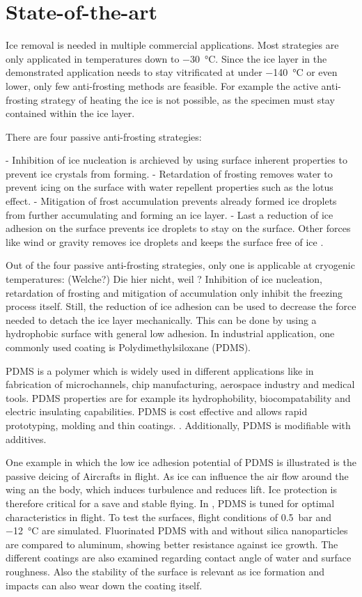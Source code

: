 \section{State-of-the-art}

Ice removal is needed in multiple commercial applications. Most strategies are only applicated in temperatures down to \SI{-30}{\degreeCelsius}. Since the ice layer in the demonstrated application needs to stay vitrificated at under \SI{-140}{\degreeCelsius} or even lower, only few anti-frosting methods are feasible. For example the active anti-frosting strategy of heating the ice is not possible, as the specimen must stay contained within the ice layer.

There are four passive anti-frosting strategies: 

- Inhibition of ice nucleation is archieved by using surface inherent properties to prevent ice crystals from forming. 
- Retardation of frosting removes water to prevent icing on the surface with water repellent properties such as the lotus effect.
- Mitigation of frost accumulation prevents already formed ice droplets from further accumulating and forming an ice layer. 
- Last a reduction of ice adhesion on the surface prevents ice droplets to stay on the surface. Other forces like wind or gravity removes ice droplets and keeps the surface free of ice \cite{Yang.2021}. 

Out of the four passive anti-frosting strategies, only one is applicable at cryogenic temperatures: (Welche?) Die hier nicht, weil ? Inhibition of ice nucleation, retardation of frosting and mitigation of accumulation only inhibit the freezing process itself. Still, the reduction of ice adhesion can be used to decrease the force needed to detach the ice layer mechanically. This can be done by using a hydrophobic surface with general low adhesion. In industrial application, one commonly used coating is Polydimethylsiloxane (PDMS).

PDMS is a polymer which is widely used in different applications like in fabrication of microchannels, chip manufacturing, aerospace industry and medical tools. PDMS properties are for example its hydrophobility, biocompatability and electric insulating capabilities. PDMS is cost effective and allows rapid prototyping, molding and thin coatings. \cite{Wolf.2018}. Additionally, PDMS is modifiable with additives.

One example in which the low ice adhesion potential of PDMS is illustrated is the passive deicing of Aircrafts in flight. As ice can influence the air flow around the wing an the body, which induces turbulence and reduces lift. Ice protection is therefore critical for a save and stable flying. In \cite{Liu.2018}, PDMS is tuned for optimal characteristics in flight. To test the surfaces, flight conditions of \SI{0.5}{\bar} and \SI{-12}{\degreeCelsius} are simulated. Fluorinated PDMS with and without silica nanoparticles are compared to aluminum, showing better resistance against ice growth. The different coatings are also examined regarding contact angle of water and surface roughness. Also the stability of the surface is relevant as ice formation and impacts can also wear down the coating itself. 

